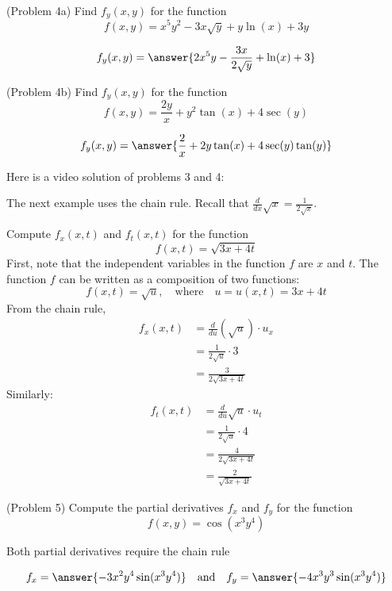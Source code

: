 \documentclass[handout]{ximera}
\begin{document}
\begin{problem}(Problem 4a)
Find $f_y(x,y)$ for the function 
\[
f(x,y) = x^5y^2 - 3x\sqrt y + y\ln(x) + 3y
\]

\[
f_y(x,y) = \answer{2x^5 y - \frac{3x}{2\sqrt y} + \ln(x) + 3}
\]
\end{problem}

\begin{problem}(Problem 4b)
Find $f_y(x,y)$ for the function 
\[
f(x,y) = \frac{2y}{x} + y^2\tan(x) + 4\sec(y)
\]

\[
f_y(x,y) = \answer{\frac{2}{x} + 2y\tan(x) + 4\sec(y)\tan(y)}
\]
\end{problem}

Here is a video solution of problems 3 and 4:\\
\begin{foldable}
\end{foldable}



The next example uses the chain rule.  
Recall that $\frac{d}{dx} \sqrt x = \frac{1}{2\sqrt x}$.

\begin{example}[Example 5]
Compute $f_x(x,t)$ and $f_t(x,t)$ for the function 
\[
f(x,t) = \sqrt{3x + 4t}
\]
First, note that the independent variables in the function $f$ are $x$ and $t$.
The function $f$ can be written as a composition of two functions:
\[
f(x,t) = \sqrt {u}, \quad \text{where} \quad u= u(x,t) = 3x + 4t
\]
From the chain rule,
\begin{align*}
f_x(x,t) &= \frac{d}{du}\left( \sqrt u\right) \cdot u_x\\
  & = \frac{1}{2\sqrt u} \cdot 3\\
  &= \frac{3}{2\sqrt{3x + 4t}}
\end{align*}
Similarly:
\begin{align*}
f_t(x,t) &= \frac{d}{du} \sqrt u \cdot u_t\\
  & = \frac{1}{2\sqrt u} \cdot 4\\
  &= \frac{4}{2\sqrt{3x + 4t}}\\
 &= \frac{2}{\sqrt{3x + 4t}}
\end{align*}
  
\end{example}

\begin{problem}(Problem 5)
Compute the partial derivatives $f_x$ and $f_y$ for the function
\[
f(x,y) = \cos(x^3y^4)
\]
\begin{hint}
Both partial derivatives require the chain rule
\end{hint}

\[
f_x = \answer{-3x^2y^4 \sin(x^3y^4)} \quad \text{and} 
\quad f_y = \answer{-4x^3y^3 \sin(x^3y^4)}
\]
\end{problem}
\end{document}
